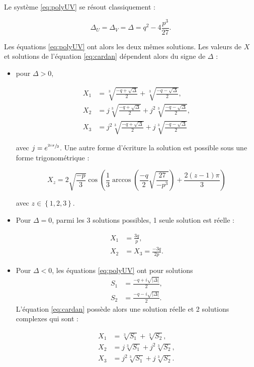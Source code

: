 Le système \ref{eq:polyUV} se résout classiquement : 

\begin{equation}
\Delta_U = \Delta_V = \Delta = q^2-4\frac{p^3}{27}.
\end{equation}

Les équations \ref{eq:polyUV} ont alors les deux mêmes solutions. Les valeurs de $X$ et solutions de l'équation \ref{eq:cardan} dépendent alors du signe de $\Delta$ : 

\begin{itemize}
\item pour $\Delta >0$, 

\begin{subequations}
\begin{align}
X_1 &= \sqrt[3]{\frac{-q+\sqrt{\Delta}}{2}}+\sqrt[3]{\frac{-q-\sqrt{\Delta}}{2}},\\
X_2 &= j\sqrt[3]{\frac{-q+\sqrt{\Delta}}{2}}+j^2\sqrt[3]{\frac{-q-\sqrt{\Delta}}{2}},\\
X_3 &= j^2\sqrt[3]{\frac{-q+\sqrt{\Delta}}{2}}+j\sqrt[3]{\frac{-q-\sqrt{\Delta}}{2}}
\end{align}
\end{subequations}

avec $j = e^{\sfrac{2i\pi}{3}}$. Une autre forme d'écriture la solution est possible sous une forme trigonométrique : 

\begin{equation}
X_{z} = 2\sqrt{\frac{-p}{3}} \cos \left(\frac{1}{3} \arccos\left(\frac{-q}{2}\sqrt{\frac{27}{-p^3}}\right) + \frac{2(z-1)\pi}{3}\right)
\end{equation}

avec $z \in \left\lbrace 1,2,3 \right\rbrace$.


\item Pour $\Delta = 0$, parmi les 3 solutions possibles, 1 seule solution est réelle : 

\begin{subequations}
\begin{align}
X_1 &= \frac{3q}{p},\\
X_2 &= X_3 = \frac{-3q}{2p}.
\end{align}
\end{subequations}

\item Pour $\Delta < 0$, les équations \ref{eq:polyUV} ont pour solutions 
\begin{align}
S_1 &= \frac{-q+i\sqrt{\vert\Delta \vert}}{2},\\
S_2 &= \frac{-q-i\sqrt{\vert \Delta \vert}}{2}. 
\end{align} 
L'équation \ref{eq:cardan} possède alors une solution réelle et 2 solutions complexes qui sont 
: 

\begin{subequations}
\begin{align}
X_1 &= \sqrt[3]{S_1}+\sqrt[3]{S_2},\\
X_2 &= j\sqrt[3]{S_1}+j^2\sqrt[3]{S_2},\\
X_3 &= j^2\sqrt[3]{S_1}+j\sqrt[3]{S_2}.
\end{align}
\end{subequations}
\end{itemize}

